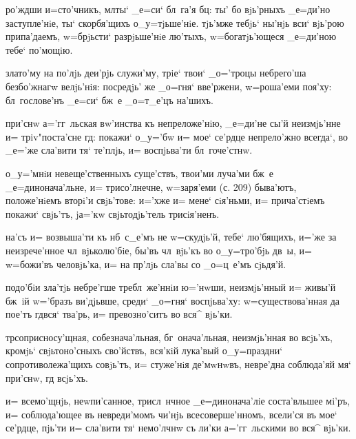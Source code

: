      
ро'ждши и=сто'чникъ, мл ты` _е=си` бл~га'я бц: 
ты' бо вjь'рныхъ _е=ди'но заступле'нiе, ты` скорбя'щихъ 
о_у=тjьше'нiе. тjь'мже тебjь` ны'нjь вси` вjь'рою 
припа'даемъ, w=брjьсти` разрjьше'нiе лю'тыхъ, 
w=богатjь'ющеся _е=ди'ною тебе` по'мощiю.


  злато'му на по'лjь деи'рjь 
служи'му, трiе` твои` _о='троцы небрего'ша безбо'жнагw 
велjь'нiя: посредjь' же _о=гня` вве'ржени, w=роша'еми 
поя'ху: бл~гослове'нъ _е=си` бж~е _о=т_е'цъ на'шихъ.

 при'снw а='гг~льская вw'инства къ 
непреложе'нiю, _е=ди'не сы'й неизмjь'нне и= 
трiv"поста'сне гд: покажи` о_у='бw и= мое` се'рдце 
непрело'жно всегда`, во _е='же сла'вити тя` те'плjь, и= 
воспjьва'ти бл~гоче'стнw. 

  о_у='мнiи невеще'ственныхъ 
суще'ствъ, твои'ми луча'ми бж~е _е=динонача'льне, и= 
трисо'лнечне, w=заря'еми (с. 209) быва'ютъ, положе'нiемъ 
вторi'и свjь'тове: и='хже и= мене` сiя'ньми, и= 
прича'стiемъ покажи` свjь'тъ, jа='кw свjьтодjь'тель 
трисiя'ненъ.

  на'съ и= возвыша'ти къ 
нб~с_е'мъ не w=скудjь'й, тебе` лю'бящихъ, и='же за 
неизрече'нное чл~вjьколю'бiе, бы'въ чл~вjь'къ во 
о_у=тро'бjь дв~ы, и= w=божи'въ человjь'ка, и= на 
пр'лjь сла'вы со _о=ц~е'мъ сjьдя'й.


 подо'бiи зла'тjь небре'гше 
требл~же'ннiи ю='нwши, неизмjь'нный и= живы'й бж~iй 
w='бразъ ви'дjьвше, среди` _о=гня` воспjьва'ху: 
w=существова'нная да пое'тъ гд вся` тва'рь, и= 
превозно'ситъ во вся^ вjь'ки.

 тр соприсносу'щная, 
собезнача'льная, бг~онача'льная, неизмjь'нная во всjь'хъ, 
кромjь` свjьтоно'сныхъ сво'йствъ, вся'кiй лука'вый 
о_у=праздни` сопротиволежа'щихъ совjь'тъ, и= стуже'нiя 
де'мwнwвъ, невре'дна соблюда'яй мя` при'снw, гд 
всjь'хъ. 

  и= всемо'щнjь, неwпи'санное, 
трисл~нчное _е=динонача'лiе соста'вльшее мi'ръ, и= 
соблюда'ющее въ невреди'момъ чи'нjь всесоверше'нномъ, 
всели'ся въ мое` се'рдце, пjь'ти и= сла'вити тя` 
немо'лчнw съ ли'ки а='гг~льскими во вся^ вjь'ки.

